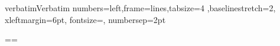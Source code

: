 \RequirePackage{titletoc}

\RequirePackage[colorlinks=true,linkcolor=blue,citecolor=blue]{hyperref} %

\RequirePackage{ulem} %
\normalem

\newcommand\reduline{\bgroup\markoverwith
{\textcolor{red}{\rule[-0.8ex]{1em}{0.4pt}}}\ULon}
\renewcommand\emshape{\color{red}}

\RequirePackage{graphicx}
\graphicspath{{figures/}}
\newenvironment{fig}[1]
{\begin{figure}[h]
\texttt{[image: \#1]}
\caption{#1}
\end{figure}}
{}
\newenvironment{scalefig}[2][0.4]
{\begin{figure}[h]
\texttt{[image: \#2]}
\caption{#2}
\end{figure}}
{}

\RequirePackage{booktabs}
\renewcommand{\arraystretch}{1.3}

\RequirePackage{fancyvrb}
\DefineVerbatimEnvironment%
{verbatim}{Verbatim}
{numbers=left,frame=lines,tabsize=4 ,baselinestretch=2,
xleftmargin=6pt, fontsize=\footnotesize , numbersep=2pt}

\newlength{\fancyvrbtopsep}
\newlength{\fancyvrbpartopsep}
\makeatletter
\FV@AddToHook{\FV@ListParameterHook}
{\topsep=\fancyvrbtopsep\partopsep=\fancyvrbpartopsep}
\makeatother
\setlength{\fancyvrbtopsep}{-15pt}   %
\setlength{\fancyvrbpartopsep}{0pt}  %

\RequirePackage{endnotes}
\RequirePackage{hyperendnotes}
\renewcommand\makeenmark{（\theenmark）}
\renewcommand\notesname {注释和参考资料}
\newcommand{\printendnotes}
    {\theendnotes}






\endinput


